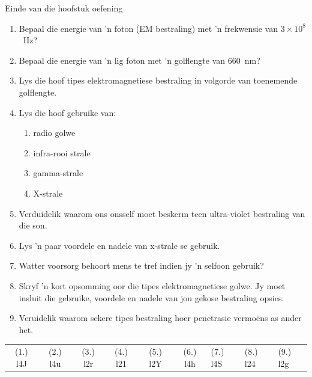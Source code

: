             \begin{eocexercises}{Einde van die hoofstuk oefening}
            \nopagebreak
      \label{m38779*id189872}\begin{enumerate}[noitemsep, label=\textbf{\arabic*}. ] 
            \label{m38779*uid34}\item Bepaal die energie van 'n foton (EM bestraling) met 'n frekwensie van $3\ensuremath{\times}{10}^{8}$~Hz?\newline
\label{m38779*uid35}\item Bepaal die energie van 'n lig foton met 'n golflengte van 660~nm?\newline
\label{m38779*uid36}\item Lys die hoof tipes elektromagnetiese bestraling in volgorde van toenemende golflengte.\newline
\label{m38779*uid37}\item Lys die hoof gebruike van:
\label{m38779*id189946}\begin{enumerate}[noitemsep, label=\textbf{\alph*}. ] 
            \label{m38779*uid38}\item radio golwe
\label{m38779*uid39}\item infra-rooi strale
\label{m38779*uid40}\item gamma-strale
\label{m38779*uid41}\item X-strale
\end{enumerate}
                \label{m38779*uid42}\item Verduidelik waarom ons onsself moet beskerm teen ultra-violet bestraling van die son. \newline
\label{m38779*uid43}\item Lys 'n paar voordele en nadele van x-strale se gebruik. \newline
\label{m38779*uid44}\item Watter voorsorg behoort mens te tref indien jy 'n selfoon gebruik? \newline
\label{m38779*uid45}\item Skryf 'n kort opsomming oor die tipes elektromagnetiese golwe. Jy moet insluit die gebruike, voordele en nadele van jou gekose bestraling opsies.\newline
\label{m38779*uid46}\item Veruidelik waarom sekere tipes bestraling hoer penetrasie vermo\"ens as ander het.\newline
\end{enumerate}
  \label{m38779**end}
  \label{459e2bef85baf867f5850bc8338cad3a**end}
\practiceinfo
 \par \begin{tabular}[h]{cccccc}
 (1.) l4J  &  (2.) l4u  &  (3.) l2r  &  (4.) l21  &  (5.) l2Y  &  (6.) l4h  &  (7.) l4S  &  (8.) l24  &  (9.) l2g  & \end{tabular}
\end{eocexercises}
